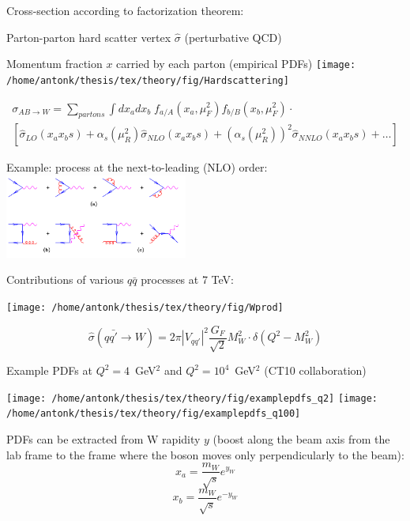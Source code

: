 \def\sighat{\hat{\sigma}}
{

\colb[T]
\centering
Cross-section according to factorization theorem:
\iteb
\item Parton-parton hard scatter vertex $\sighat$ (perturbative QCD)
\item Momentum fraction $x$ carried by each parton (empirical PDFs)
\itee
{}
\centering
\texttt{[image: /home/antonk/thesis/tex/theory/fig/Hardscattering]}
\cole

\begin{equation}
\begin{split}
\sigma_{AB\to W} = \sum\limits_{partons} \int dx_a dx_b\; f_{a/A}(x_a,\mu_{F}^2) f_{b/B}(x_b,\mu_{F}^2) \cdot \\
\left[ \sighat_{LO}(x_{a}x_{b}s) + \alpha_{s}(\mu_{R}^2)\sighat_{NLO}(x_{a}x_{b}s) + \left(\alpha_{s}(\mu_{R}^2)\right)^{2}\sighat_{NNLO}(x_{a}x_{b}s) + \ldots \right]
\end{split}
\end{equation}

\centering
\tiny{ Example: process at the next-to-leading (NLO) order: } \\
\includegraphics[width=0.45\textwidth]{dates/mtg/figures/wz/nlo}

}

{

\centering
Contributions of various $q\bar{q}$ processes at 7 TeV:

\centering
\texttt{[image: /home/antonk/thesis/tex/theory/fig/Wprod]}

$$ \sighat(q\bar{q'} \rightarrow W) = 2\pi|V_{qq'}|^2 \frac{G_F}{\sqrt{2}} M_{W}^{2} \cdot \delta\left(Q^2 - M_{W}^{2}\right)$$

}

{

\centering
\small{ Example PDFs at $Q^2 = 4$~GeV$^2$ and $Q^2 = 10^4$~GeV$^2$ (CT10 collaboration) }

\texttt{[image: /home/antonk/thesis/tex/theory/fig/examplepdfs\_q2]} 
\texttt{[image: /home/antonk/thesis/tex/theory/fig/examplepdfs\_q100]}

\small{PDFs can be extracted from W rapidity $y$ (boost along the beam axis from the lab frame to the frame where the boson moves only perpendicularly to the beam):}
$$ x_a = \frac{m_W}{\sqrt s} e^{y_W} $$
$$ x_b = \frac{m_W}{\sqrt s} e^{-y_W} $$

}

